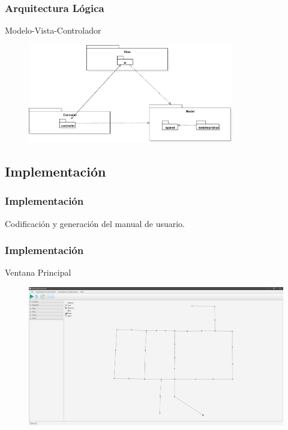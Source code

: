 \documentclass[9pt]{beamer}
\begin{document}
    \begin{frame}
        \frametitle{Arquitectura Lógica}  

        Modelo-Vista-Controlador
        \begin{figure}
            \includegraphics[width=0.8\textwidth]{assets/ArquitecturaLogica.eps}
        \end{figure}

    \end{frame}

    \subsection{Implementación}

    \begin{frame}
        \frametitle{Implementación}                       
        Codificación y generación del manual de usuario.

    \end{frame}

    \begin{frame}
        \frametitle{Implementación}
        Ventana Principal                   
        \begin{figure}
            \includegraphics[width=\textwidth]{assets/Interfaces/Principal.png}
        \end{figure}
    \end{frame}
    
\end{document}
